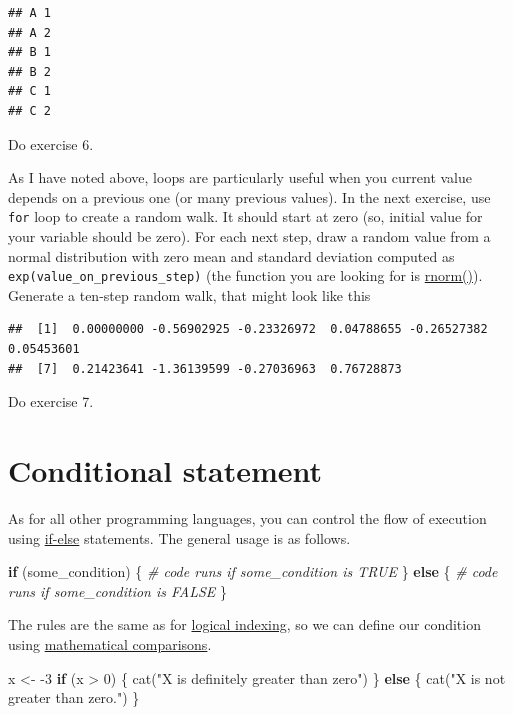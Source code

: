 \documentclass[
]{book}
\newenvironment{Shaded}{\begin{snugshade}}{\end{snugshade}}
\newcommand{\CommentTok}[1]{\textcolor[rgb]{0.56,0.35,0.01}{\textit{#1}}}
\newcommand{\ControlFlowTok}[1]{\textcolor[rgb]{0.13,0.29,0.53}{\textbf{#1}}}
\newcommand{\DecValTok}[1]{\textcolor[rgb]{0.00,0.00,0.81}{#1}}
\newcommand{\FunctionTok}[1]{\textcolor[rgb]{0.00,0.00,0.00}{#1}}
\newcommand{\NormalTok}[1]{#1}
\newcommand{\OtherTok}[1]{\textcolor[rgb]{0.56,0.35,0.01}{#1}}
\newcommand{\SpecialCharTok}[1]{\textcolor[rgb]{0.00,0.00,0.00}{#1}}
\newcommand{\StringTok}[1]{\textcolor[rgb]{0.31,0.60,0.02}{#1}}
\begin{document}
\begin{verbatim}
## A 1 
## A 2 
## B 1 
## B 2 
## C 1 
## C 2
\end{verbatim}

Do exercise 6.

As I have noted above, loops are particularly useful when you current value depends on a previous one (or many previous values). In the next exercise, use \texttt{for} loop to create a random walk. It should start at zero (so, initial value for your variable should be zero). For each next step, draw a random value from a normal distribution with zero mean and standard deviation computed as \texttt{exp(value\_on\_previous\_step)} (the function you are looking for is \href{https://stat.ethz.ch/R-manual/R-devel/library/stats/html/Normal.html}{rnorm()}). Generate a ten-step random walk, that might look like this

\begin{verbatim}
##  [1]  0.00000000 -0.56902925 -0.23326972  0.04788655 -0.26527382  0.05453601
##  [7]  0.21423641 -1.36139599 -0.27036963  0.76728873
\end{verbatim}

Do exercise 7.

\hypertarget{if-else}{%
\section{Conditional statement}\label{if-else}}

As for all other programming languages, you can control the flow of execution using \href{https://stat.ethz.ch/R-manual/R-devel/library/base/html/Control.html}{if-else} statements. The general usage is as follows.

\begin{Shaded}
\begin{Highlighting}[]
\ControlFlowTok{if}\NormalTok{ (some\_condition) \{}
  \CommentTok{\# code runs if some\_condition is TRUE}
\NormalTok{\} }\ControlFlowTok{else}\NormalTok{ \{}
  \CommentTok{\# code runs if some\_condition is FALSE}
\NormalTok{\}}
\end{Highlighting}
\end{Shaded}

The rules are the same as for \protect\hyperlink{logical-indexing}{logical indexing}, so we can define our condition using \href{https://stat.ethz.ch/R-manual/R-devel/library/base/html/Comparison.html}{mathematical comparisons}.

\begin{Shaded}
\begin{Highlighting}[]
\NormalTok{x }\OtherTok{\textless{}{-}} \SpecialCharTok{{-}}\DecValTok{3}
\ControlFlowTok{if}\NormalTok{ (x }\SpecialCharTok{\textgreater{}} \DecValTok{0}\NormalTok{) \{}
  \FunctionTok{cat}\NormalTok{(}\StringTok{"X is definitely greater than  zero"}\NormalTok{)}
\NormalTok{\} }\ControlFlowTok{else}\NormalTok{ \{}
  \FunctionTok{cat}\NormalTok{(}\StringTok{"X is not greater than zero."}\NormalTok{)}
\NormalTok{\}}
\end{Highlighting}
\end{Shaded}
\end{document}
